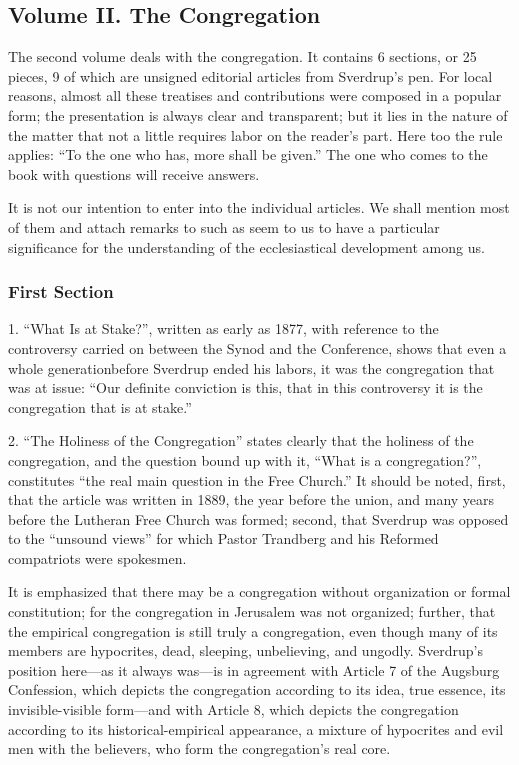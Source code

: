 \subsection{Volume II. The Congregation}

The second volume deals with the congregation. It contains 6 sections, or 25 pieces, 9 of which are unsigned editorial articles from Sverdrup’s pen. For local reasons, almost all these treatises and contributions were composed in a popular form; the presentation is always clear and transparent; but it lies in the nature of the matter that not a little requires labor on the reader’s part. Here too the rule applies: “To the one who has, more shall be given.” The one who comes to the book with questions will receive answers.

It is not our intention to enter into the individual articles. We shall mention most of them and attach remarks to such as seem to us to have a particular significance for the understanding of the ecclesiastical development among us.


\subsubsection{First Section}

1. “What Is at Stake?”, written as early as 1877, with reference to the controversy carried on between the Synod and the Conference, shows that even a whole generationbefore Sverdrup ended his labors, it was the congregation that was at issue: “Our definite conviction is this, that in this controversy it is the congregation that is at stake.”

2. “The Holiness of the Congregation” states clearly that the holiness of the congregation, and the question bound up with it, “What is a congregation?”, constitutes “the real main question in the Free Church.” It should be noted, first, that the article was written in 1889, the year before the union, and many years before the Lutheran Free Church was formed; second, that Sverdrup was opposed to the “unsound views” for which Pastor Trandberg and his Reformed compatriots were spokesmen.

It is emphasized that there may be a congregation without organization or formal constitution; for the congregation in Jerusalem was not organized; further, that the empirical congregation is still truly a congregation, even though many of its members are hypocrites, dead, sleeping, unbelieving, and ungodly. Sverdrup’s position here—as it always was—is in agreement with Article 7 of the Augsburg Confession, which depicts the congregation according to its idea, true essence, its invisible-visible form—and with Article 8, which depicts the congregation according to its historical-empirical appearance, a mixture of hypocrites and evil men with the believers, who form the congregation’s real core.

